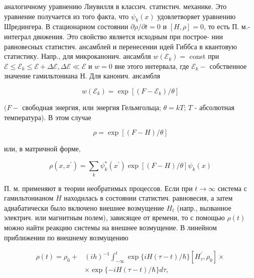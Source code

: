 \documentclass[10pt]{article}
\begin{document}
аналогичному уравнению Лиувилля в классич. статистич. механике. Это уравнение получается из того факта, что $\psi_{k}(x)$ удовлетворяет уравнению Шредингера. В стационарном состоянии $\partial \rho / \partial t=0$ и $[H, \rho]=0$, то есть П. м.- интеграл движения. Это свойство является исходным при построе- нии равновесных статистич. ансамблей и перенесении идей Гиббса в квантовую статистику. Напр., для микроканонич. ансамбля $w\left(\mathscr{E}_{k}\right)=$ const при $\mathscr{E} \leqslant \mathscr{E}_{k} \leqslant \mathscr{E}+\Delta \mathscr{E}, \Delta \mathscr{E} \ll \mathscr{E}$ и $w=0$ вне этого интервала, где $\mathscr{E}_{k}-$ собственное значение гамильтониана $Н$. Для канонич. ансамбля



\[

w\left(\mathscr{E}_{k}\right)=\exp \left[\left(F-\mathscr{E}_{k}\right) / \theta\right]

\]



$(F-$ свободная энергия, или энергия Гельмгольца; $\theta=k T$; $T$ - абсолютная температура). В этом случае



\[

\rho=\exp [(F-H) / \theta]

\]



или, в матричной форме,



\[

\rho\left(x, x^{\prime}\right)=\sum_{k} \psi_{k}^{*}\left(x^{\prime}\right) \exp [(F-H) / \theta] \psi_{k}(x)

\]



П. м. применяют в теории необратимых процессов. Если при $t \rightarrow \infty$ система с гамильтонианом $H$ находилась в состоянии статистич. равновесия, а затем адиабатически было включено внешнее возмущение $H_{t}$ (напр., вызванное электрич. или магнитным полем), зависящее от времени, то с помощью $\rho(t)$ можно найти реакцию системы на внешнее возмущение. В линейном приближении по внешнему возмущению



\[

\begin{aligned}

\rho(t)=\rho_{0}+ & (i h)^{-1} \int_{-\infty}^{t} \exp \{i H(\tau-t) / \hbar\}\left[H_{\tau}^{\prime}, \rho_{0}\right] \times \\

& \times \exp \{-i H(\tau-t) / \hbar\} d \tau,

\end{aligned}

\]
\end{document}
